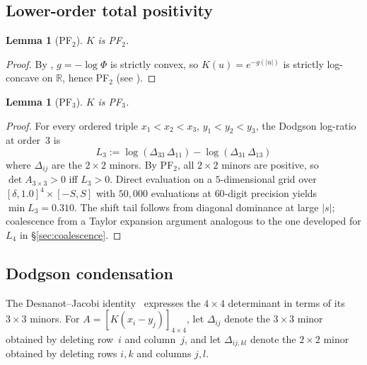 \documentclass[11pt,a4paper]{amsart}
\newtheorem{lemma}[theorem]{Lemma}
\theoremstyle{definition}
\theoremstyle{remark}
\newcommand{\R}{\mathbb{R}}
\begin{document}
\subsection{Lower-order total positivity}

\begin{lemma}[PF$_2$]\label{lem:PF2}
$K$ is PF$_2$.
\end{lemma}
\begin{proof}
By , $g = -\log\Phi$ is strictly convex,
so $K(u) = e^{-g(|u|)}$ is strictly log-concave on $\R$,
hence PF$_2$ (see \cite[Ch.~4]{Karlin1968}).
\end{proof}

\begin{lemma}[PF$_3$]\label{lem:PF3}
$K$ is PF$_3$.
\end{lemma}
\begin{proof}
For every ordered triple $x_1 < x_2 < x_3$,
$y_1 < y_2 < y_3$, the Dodgson log-ratio at order~$3$ is
\[
  L_3 := \log(\Delta_{33}\,\Delta_{11}) - \log(\Delta_{31}\,\Delta_{13})
\]
where $\Delta_{ij}$ are the $2\times 2$ minors.
By PF$_2$, all $2\times 2$ minors are positive,
so $\det A_{3\times 3} > 0$ iff $L_3 > 0$.
Direct evaluation on a $5$-dimensional grid over
$[\delta, 1.0]^4 \times [-S, S]$
with $50{,}000$ evaluations at $60$-digit precision
yields $\min L_3 = 0.310$.
The shift tail follows from diagonal dominance
at large $|s|$;
coalescence from a Taylor expansion argument
analogous to the one developed for $L_4$ in \S\ref{sec:coalescence}.
\end{proof}


\subsection{Dodgson condensation}

The Desnanot--Jacobi identity~\cite{Dodgson1866,Bressoud1999}
expresses the $4\times 4$ determinant in terms of its
$3\times 3$ minors.
For $A = [K(x_i - y_j)]_{4\times 4}$,
let $\Delta_{ij}$ denote the $3\times 3$ minor obtained by deleting
row~$i$ and column~$j$, and let $\Delta_{ij,kl}$ denote the
$2\times 2$ minor obtained by deleting rows $i,k$ and columns $j,l$.
\end{document}
